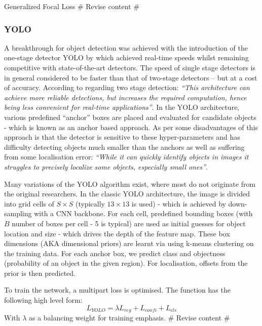 \documentclass[a4paper,twoside,12pt]{report}
\begin{document}
Generalized Focal Loss \citep{focalloss}  \# Revise content \#

\subsubsection{YOLO}

A breakthrough for object detection was achieved with the introduction of the one-stage detector YOLO by \cite{yolo} which achieved real-time speeds whilst remaining competitive with state-of-the-art detectors. The speed of single stage detectors is in general considered to be faster than that of two-stage detectors -- but at a cost of accuracy. According to \cite{stagecomp} regarding two stage detection: \textit{``This architecture can achieve more reliable detections, but increases the required computation, hence being less convenient for real-time applications''}. In the YOLO architecture, various predefined ``anchor'' boxes are placed and evaluated for candidate objects - which is known as an anchor based approach. As per \cite{yolo} some disadvantages of this approach is that the detector is sensitive to these hyper-parameters and has difficulty detecting objects much smaller than the anchors as well as suffering from some localisation error: \textit{``While it can quickly identify objects in images it struggles to precisely localize some objects, especially small ones''}.

Many variations of the YOLO algorithm exist, where most do not originate from the original researchers. In the classic YOLO architecture, the image is divided into grid cells of $S\times S$ (typically $13\times 13$ is used) - which is achieved by down-sampling with a CNN backbone. For each cell, predefined bounding boxes (with $B$ number of boxes per cell - 5 is typical) are used as initial guesses for object location and size - which drives the depth of the feature map. These box dimensions (AKA dimensional priors) are learnt via using k-means clustering on the training data. For each anchor box, we predict class and objectness (probability of an object in the given region). For localisation, offsets from the prior is then predicted. \citep{comprehensive}

\cite{yolocomprehensive}

To train the network, a multipart loss is optimised. The function has the following high level form:
\begin{equation}
L_{YOLO} =  \lambda L_{reg} + L_{confi} + L_{cls} 
\end{equation} 
With $\lambda$ as a balancing weight for training emphasis.  \# Revise content \#
\end{document}
